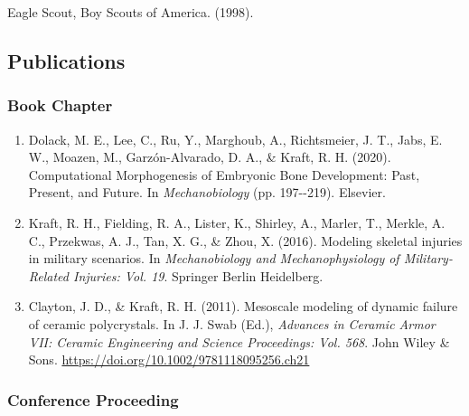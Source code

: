 \documentclass[
]{article}
\begin{document}
Eagle Scout, Boy Scouts of America. (1998).

\subsection{Publications}\label{publications}

\subsubsection{Book Chapter}\label{book-chapter}

\begin{enumerate}
\def\labelenumi{\arabic{enumi}.}
\item
  Dolack, M. E., Lee, C., Ru, Y., Marghoub, A., Richtsmeier, J. T.,
  Jabs, E. W., Moazen, M., Garzón-Alvarado, D. A., \& Kraft, R. H.
  (2020). Computational Morphogenesis of Embryonic Bone Development:
  Past, Present, and Future. In \emph{Mechanobiology} (pp. 197-\/-219).
  Elsevier.
\item
  Kraft, R. H., Fielding, R. A., Lister, K., Shirley, A., Marler, T.,
  Merkle, A. C., Przekwas, A. J., Tan, X. G., \& Zhou, X. (2016).
  Modeling skeletal injuries in military scenarios. In
  \emph{Mechanobiology and Mechanophysiology of Military-Related
  Injuries: Vol. 19}. Springer Berlin Heidelberg.
\item
  Clayton, J. D., \& Kraft, R. H. (2011). Mesoscale modeling of dynamic
  failure of ceramic polycrystals. In J. J. Swab (Ed.), \emph{Advances
  in Ceramic Armor VII: Ceramic Engineering and Science Proceedings:
  Vol. 568}. John Wiley \& Sons.
  \url{https://doi.org/10.1002/9781118095256.ch21}
\end{enumerate}

\subsubsection{Conference Proceeding}\label{conference-proceeding}
\end{document}

